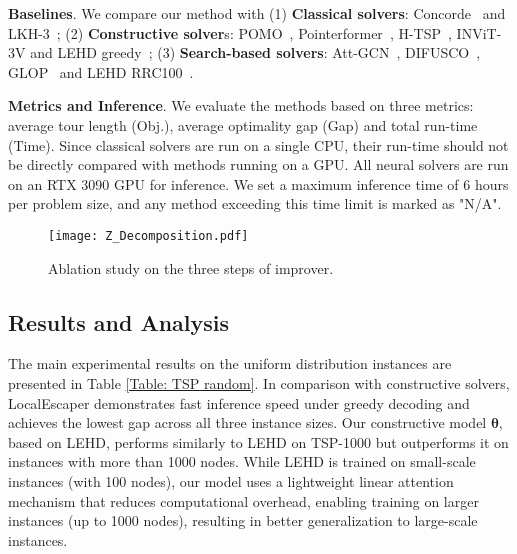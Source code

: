 \textbf{Baselines}. We compare our method with 
(1) \textbf{Classical solvers}: Concorde~\cite{applegate2009certification} and LKH-3~\cite{helsgaun2017extension}; 
(2) \textbf{Constructive solver}s: POMO~\cite{kwon2020pomo}, Pointerformer~\cite{jin2023pointerformer}, H-TSP~\cite{pan2023h}, INViT-3V\cite{fang2024invit} and LEHD greedy~\cite{luo2023neural}; (3) \textbf{Search-based solvers}: Att-GCN~\cite{fu2021generalize}, DIFUSCO~\cite{sun2023difusco}, GLOP~\cite{ye2024glop} and LEHD RRC100~\cite{luo2023neural}. 

\textbf{Metrics and Inference}.
We evaluate the methods based on three metrics: average tour length (Obj.), average optimality gap (Gap) and total run-time (Time). 
Since classical solvers are run on a single CPU, their run-time should not be directly compared with methods running on a GPU. 
All neural solvers are run on an RTX 3090 GPU for inference. We set a maximum inference time of 6 hours per problem size, and any method exceeding this time limit is marked as "N/A". 




\begin{figure}[t]
\centering
\texttt{[image: Z\_Decomposition.pdf]}
\caption{Ablation study on the three steps of improver. %
}
\label{fig:Decomposition}
\end{figure}

\subsection{Results and Analysis}
The main experimental results on the uniform distribution instances are presented in Table \ref{Table: TSP random}. 
In comparison with constructive solvers, LocalEscaper demonstrates  fast inference speed under greedy decoding and achieves the lowest gap across all three instance sizes. Our constructive model $\boldsymbol{\theta}$, based on LEHD, performs similarly to LEHD on TSP-1000 but outperforms it on instances with more than 1000 nodes. %
While LEHD is trained on small-scale instances (with 100 nodes), our model uses a lightweight linear attention mechanism that reduces computational overhead, enabling training on larger instances (up to 1000 nodes), resulting in better generalization to large-scale instances.

